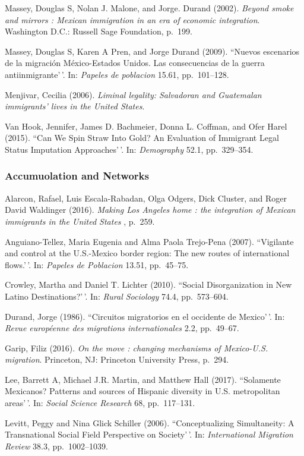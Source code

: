 \documentclass[11pt,]{article}
\begin{document}
Massey, Douglas S, Nolan J. Malone, and Jorge. Durand (2002).
\emph{Beyond smoke and mirrors : Mexican immigration in an era of economic integration}.
Washington D.C.: Russell Sage Foundation, p.~199.

Massey, Douglas S, Karen A Pren, and Jorge Durand (2009). ``Nuevos
escenarios de la migración México-Estados Unidos. Las consecuencias de
la guerra antiinmigrante'\,'. In: \emph{Papeles de poblacion} 15.61,
pp.~101--128.

Menjivar, Cecilia (2006).
\emph{Liminal legality: Salvadoran and Guatemalan immigrants' lives in the United States}.

Van Hook, Jennifer, James D. Bachmeier, Donna L. Coffman, and Ofer Harel
(2015). ``Can We Spin Straw Into Gold? An Evaluation of Immigrant Legal
Status Imputation Approaches'\,'. In: \emph{Demography} 52.1,
pp.~329--354.

\hypertarget{accumuolation-and-networks}{%
\subsubsection{Accumuolation and
Networks}\label{accumuolation-and-networks}}

Alarcon, Rafael, Luis Escala-Rabadan, Olga Odgers, Dick Cluster, and
Roger David Waldinger (2016).
\emph{Making Los Angeles home : the integration of Mexican immigrants in the United States}
, p.~259.

Anguiano-Tellez, Maria Eugenia and Alma Paola Trejo-Pena (2007).
``Vigilante and control at the U.S.-Mexico border region: The new routes
of international flows.'\,'. In: \emph{Papeles de Poblacion} 13.51,
pp.~45--75.

Crowley, Martha and Daniel T. Lichter (2010). ``Social Disorganization
in New Latino Destinations?'\,'. In: \emph{Rural Sociology} 74.4,
pp.~573--604.

Durand, Jorge (1986). ``Circuitos migratorios en el occidente de
Mexico'\,'. In: \emph{Revue européenne des migrations internationales}
2.2, pp.~49--67.

Garip, Filiz (2016).
\emph{On the move : changing mechanisms of Mexico-U.S. migration}.
Princeton, NJ: Princeton University Press, p.~294.

Lee, Barrett A, Michael J.R. Martin, and Matthew Hall (2017).
``Solamente Mexicanos? Patterns and sources of Hispanic diversity in
U.S. metropolitan areas'\,'. In: \emph{Social Science Research} 68,
pp.~117--131.

Levitt, Peggy and Nina Glick Schiller (2006). ``Conceptualizing
Simultaneity: A Transnational Social Field Perspective on Society'\,'.
In: \emph{International Migration Review} 38.3, pp.~1002--1039.
\end{document}
